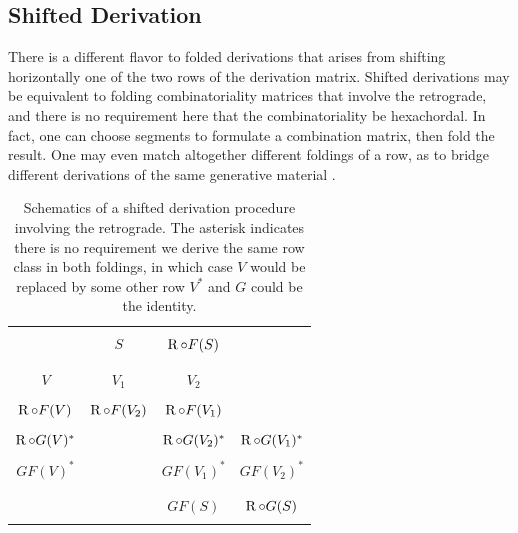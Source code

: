 \subsection{Shifted Derivation} \label{shifted-derivation}

There is a different flavor to folded derivations that arises from shifting horizontally one of the two rows of the derivation matrix. Shifted derivations may be equivalent to folding combinatoriality matrices that involve the retrograde, and there is no requirement here that the combinatoriality be hexachordal. In fact, one can choose segments to formulate a combination matrix, then fold the result. One may even match altogether different foldings of a row, as to bridge different derivations of the same generative material \cite[216]{Starr1984}.

\begin{table}[htbp]
    \caption[Shifted Derivation Involving the Retrograde]{Schematics of a shifted derivation procedure involving the retrograde. The asterisk indicates there is no requirement we derive the same row class in both foldings, in which case $V$ would be replaced by some other row $V^*$ and $G$ could be the identity.}
    \label{derivation-shifted}
    \centering
    \vspace{12pt}
    \begin{tabular}{ c | c c c }
        \hline\\
        & $S$ & $\operatorname{R} \circ F(S)$ & \\\\
        \hline\\
        $V$ & $V_1$ & $V_2$ & \\\\
        $\operatorname{R} \circ F(V)$ & $\operatorname{R} \circ F(V_2)$ & $\operatorname{R} \circ F(V_1)$ & \\\\
        $\operatorname{R} \circ G(V)^*$ && $\operatorname{R} \circ G(V_2)^*$ & $\operatorname{R} \circ G(V_1)^*$ \\\\
        $GF(V)^*$ && $GF(V_1)^*$ & $GF(V_2)^*$ \\\\
        \hline\\
        && $GF(S)$ & $\operatorname{R} \circ G(S)$ \\\\
        \hline
    \end{tabular}
\end{table}

